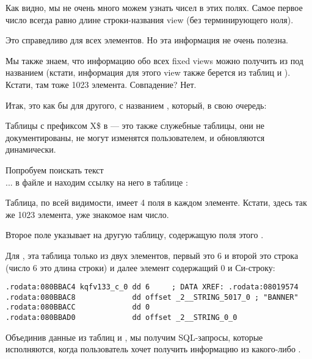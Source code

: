 Как видно, мы не очень много можем узнать чисел в этих полях. Самое первое число всегда равно длине строки-названия view (без терминирующего ноля).

Это справедливо для всех элементов. Но эта информация не очень полезна.

Мы также знаем, что информацию обо всех fixed views можно получить из  под названием
(кстати, информация для этого view также берется из таблиц  и ).
Кстати, там тоже 1023 элемента. Совпадение? Нет.



Итак,  это как бы  для другого, с названием , который, в свою очередь:



Таблицы с префиксом X\$ в \oracle --- это также служебные таблицы, они не документированы,
не могут изменятся пользователем, и обновляются динамически.

Попробуем поискать текст \\

... в файле  и находим ссылку на него в таблице :



Таблица, по всей видимости, имеет 4 поля в каждом элементе. Кстати, здесь так же 1023 элемента, уже знакомое нам число.

Второе поле указывает на другую таблицу, содержащую поля этого .

Для , эта таблица только из двух элементов, первый это 6 и второй это строка 
 (число 6 это длина строки) и далее  элемент содержащий 0 и  
Си-строку:

\begin{lstlisting}[caption=kqf.o,style=customasmx86]
.rodata:080BBAC4 kqfv133_c_0 dd 6     ; DATA XREF: .rodata:08019574
.rodata:080BBAC8             dd offset _2__STRING_5017_0 ; "BANNER"
.rodata:080BBACC             dd 0
.rodata:080BBAD0             dd offset _2__STRING_0_0
\end{lstlisting}

Объединив данные из таблиц  и , мы получим SQL-запросы, которые исполняются, когда пользователь хочет получить информацию из какого-либо .

